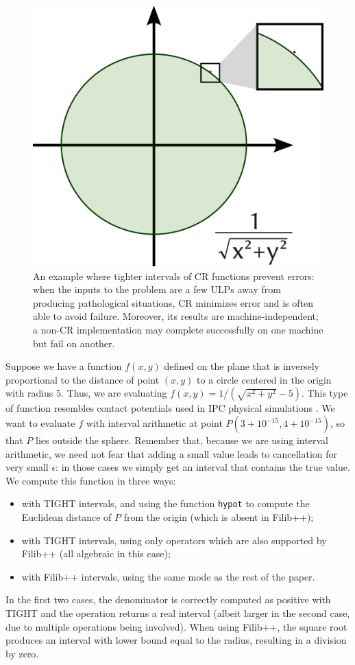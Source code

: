 \begin{figure}
	\includegraphics[width=0.8\linewidth]{fig/example.png}
	\centering
	\caption{An example where tighter intervals of CR functions prevent errors: when the inputs to the problem are a few ULPs away from producing pathological situations, CR minimizes error and is often able to avoid failure. Moreover, its results are machine-independent; a non-CR implementation may complete successfully on one machine but fail on another.}
	\label{fig:tori}
\end{figure}
Suppose we have a function $f(x,y)$ defined on the plane that is inversely proportional to the distance of point $(x,y)$ to a circle centered in the origin with radius 5.
Thus, we are evaluating $f(x,y) = 1/(\sqrt{x^2 + y^2}-5)$.
This type of function resembles contact potentials used in IPC physical simulations \cite{Li2020IPC}.
We want to evaluate $f$ with interval arithmetic at point $P(3+10^{-15},4+10^{-15})$, so that $P$ lies outside the sphere. Remember that, because we are using interval arithmetic, we need not fear that adding a small value leads to cancellation for very small $\epsilon$: in those cases we simply get an interval that contains the true value.
We compute this function in three ways:
\begin{itemize}
	\item with TIGHT intervals, and using the function \texttt{hypot} to compute the Euclidean distance of $P$ from the origin (which is absent in Filib++);
	\item with TIGHT intervals, using only operators which are also supported by Filib++ (all algebraic in this case);
	\item with Filib++ intervals, using the same mode as the rest of the paper.
\end{itemize}
In the first two cases, the denominator is correctly computed as positive with TIGHT and the operation returns a real interval (albeit larger in the second case, due to multiple operations being involved).
When using Filib++, the square root produces an interval with lower bound equal to the radius, resulting in a division by zero.

